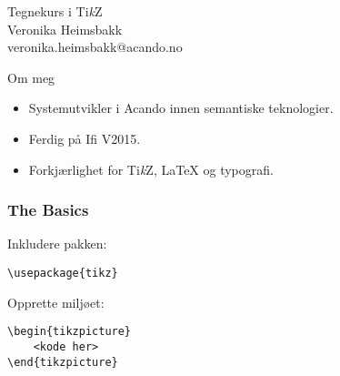 \documentclass{beamer}
\begin{document}
\begin{frame}
\begin{center}
\Huge{Tegnekurs i Ti\textit{k}Z} \\
\vspace{10pt}
\Large{Veronika Heimsbakk}\\
veronika.heimsbakk@acando.no
\end{center}
\end{frame}

\begin{frame}{Om meg}
\begin{itemize}
\item
Systemutvikler i Acando innen semantiske teknologier.
\item
Ferdig på Ifi V2015.
\item
Forkjærlighet for Ti\textit{k}Z, \LaTeX{} og typografi.
\end{itemize}
\end{frame}

\begin{frame}[fragile]
\frametitle{The Basics}

Inkludere pakken:
\begin{Verbatim}[fontsize=\small]
\usepackage{tikz}
\end{Verbatim}

\vspace{20pt}

Opprette miljøet:
\begin{Verbatim}[fontsize=\small]
\begin{tikzpicture}
    <kode her>
\end{tikzpicture}
\end{Verbatim}

\end{frame}
\end{document}
